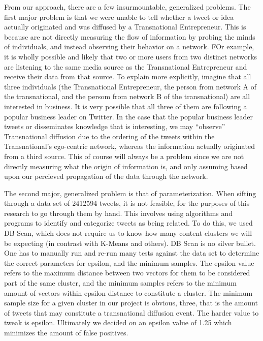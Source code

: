 From our approach, there are a few insurmountable, generalized
problems. The first major problem is that we were unable to tell
whether a tweet or idea actually originated and was diffused by a
Transnational Entrepreneur. This is because are not directly measuring
the flow of information by probing the minds of individuals, and
instead observing their behavior on a network. FOr example, it is
wholly possible and likely that two or more users from two distinct
networks are listening to the same media source as the Transnational
Entrepreneur and receive their data from that source. To explain more
explicitly, imagine that all three individuals (the Transnational
Entrepreneur, the person from network A of the transnational, and the
persom from network B of the transnational) are all interested in
business. It is very possible that all three of them are following a
popular business leader on Twitter. In the case that the popular
business leader tweets or disseminates knowledge that is interesting,
we may ``observe'' Transnational diffusion due to the ordering of the
tweets within the Transnational's ego-centric network, whereas the
information actually originated from a third source. This of course
will always be a problem since we are not directly measuring what the
origin of information is, and only assuming based upon our percieved
propagation of the data through the network.

The second major, generalized problem is that of parameterization.
When sifting through a data set of 2412594 tweets, it is not feasible,
for the purposes of this research to go through them by hand. This
involves using algorithms and programs to identify and categorize
tweets as being related. To do this, we used DB Scan, which does not
require us to know how many content clusters we will be expecting (in
contrast with K-Means and others). DB Scan is no silver bullet. One
has to manually run and re-run many tests against the data set to
determine the correct parameters for epsilon, and the minimum
samples. The epsilon value refers to the maximum distance between two
vectors for them to be considered part of the same cluster, and the
minimum samples refers to the minimum amount of vectors within epsilon
distance to constitute a cluster. The minimum sample size for a given
cluster in our project is obvious, three, that is the amount of tweets
that may constitute a transnational diffusion event. The harder value
to tweak is epsilon. Ultimately we decided on an epsilon value of 1.25
which minimizes the amount of false positives.

